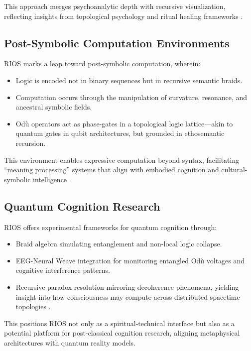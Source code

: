 \documentclass[12]{amsart}
\theoremstyle{plain}
\begin{document}
This approach merges psychoanalytic depth with recursive visualization, reflecting insights from topological psychology and ritual healing frameworks \cite{van2016neuroscience, drewal1992african}.

\subsection{Post-Symbolic Computation Environments}

RIOS marks a leap toward post-symbolic computation, wherein:

\begin{itemize}
    \item Logic is encoded not in binary sequences but in recursive semantic braids.
    \item Computation occurs through the manipulation of curvature, resonance, and ancestral symbolic fields.
    \item Odù operators act as phase-gates in a topological logic lattice—akin to quantum gates in qubit architectures, but grounded in ethosemantic recursion.
\end{itemize}

This environment enables expressive computation beyond syntax, facilitating “meaning processing” systems that align with embodied cognition and cultural-symbolic intelligence \cite{maturana1980autopoiesis}.

\subsection{Quantum Cognition Research}

RIOS offers experimental frameworks for quantum cognition through:

\begin{itemize}
    \item Braid algebra simulating entanglement and non-local logic collapse.
    \item EEG-Neural Weave integration for monitoring entangled Odù voltages and cognitive interference patterns.
    \item Recursive paradox resolution mirroring decoherence phenomena, yielding insight into how consciousness may compute across distributed spacetime topologies \cite{penrose1994shadows}.
\end{itemize}

This positions RIOS not only as a spiritual-technical interface but also as a potential platform for post-classical cognition research, aligning metaphysical architectures with quantum reality models.
\end{document}
